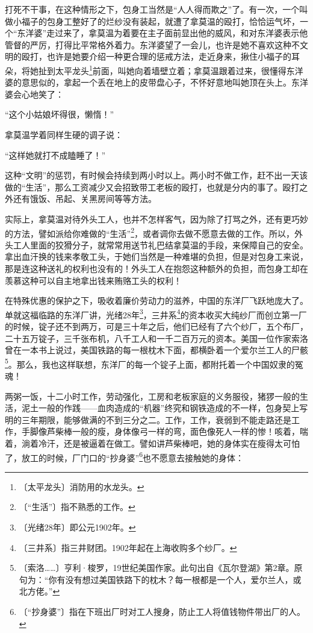 \documentclass[12pt,UTF-8,openany]{ctexbook}
\begin{document}
\begin{large}
    打死不干事，在这种情形之下，包身工当然是“人人得而欺之”了。有一次，一个叫做小福子的包身工整好了的烂纱没有装起，就遭了拿莫温的殴打，恰恰运气坏，一个“东洋婆”走过来了，拿莫温为着要在主子面前显出他的威风，和对东洋婆表示他管督的严厉，打得比平常格外着力。东洋婆望了一会儿，也许是她不喜欢这种不文明的殴打，也许是她要介绍一种更合理的惩戒方法，走近身来，揪住小福子的耳朵，将她扯到太平龙头\footnote{〔太平龙头〕消防用的水龙头。}前面，叫她向着墙壁立着；拿莫温跟着过来，很懂得东洋婆的意思似的，拿起一个丢在地上的皮带盘心子，不怀好意地叫她顶在头上。东洋婆会心地笑了：
    
    “这个小姑娘坏得很，懒惰！”
    
    拿莫温学着同样生硬的调子说：
    
    “这样她就打不成瞌睡了！”
    
    这种“文明”的惩罚，有时候会持续到两小时以上。两小时不做工作，赶不出一天该做的“生活”，那么工资减少又会招致带工老板的殴打，也就是分内的事了。殴打之外还有饿饭、吊起、关黑房间等等方法。
    
    实际上，拿莫温对待外头工人，也并不怎样客气，因为除了打骂之外，还有更巧妙的方法，譬如派给你难做的“生活”\footnote{〔“生活”〕指不熟悉的工作。}，或者调你去做不愿意去做的工作。所以，外头工人里面的狡猾分子，就常常用送节礼巴结拿莫温的手段，来保障自己的安全。拿出血汗换的钱来孝敬工头，于她们当然是一种难堪的负担，但是对包身工来说，那是连这种送礼的权利也没有的！外头工人在抱怨这种额外的负担，而包身工却在羡慕这种可以自主地拿出钱来贿赂工头的权利！
    
    在特殊优惠的保护之下，吸收着廉价劳动力的滋养，中国的东洋厂飞跃地庞大了。单就这福临路的东洋厂讲，光绪28年\footnote{〔光绪28年〕即公元1902年。}，三井系\footnote{〔三井系〕指三井财团。1902年起在上海收购多个纱厂。}的资本收买大纯纱厂而创立第一厂的时候，锭子还不到两万，可是三十年之后，他们已经有了六个纱厂，五个布厂，二十五万锭子，三千张布机，八千工人和一千二百万元的资本。美国一位作家索洛曾在一本书上说过，美国铁路的每一根枕木下面，都横卧着一个爱尔兰工人的尸骸\footnote{〔索洛……〕亨利·梭罗，19世纪美国作家。此句出自《瓦尔登湖》第2章。原句为：“你有没有想过美国铁路下的枕木？每一根都是一个人，爱尔兰人，或北方佬。”}。那么，我也这样联想，东洋厂的每一个锭子上面，都附托着一个中国奴隶的冤魂！
    
    两粥一饭，十二小时工作，劳动强化，工房和老板家庭的义务服役，猪猡一般的生活，泥土一般的作践——血肉造成的“机器”终究和钢铁造成的不一样，包身契上写明的三年期限，能够做满的不到三分之二。工作，工作，衰弱到不能走路还是工作，手脚像芦柴棒一般的瘦，身体像弓一样的弯，面色像死人一样的惨！咳着，喘着，淌着冷汗，还是被逼着在做工。譬如讲芦柴棒吧，她的身体实在瘦得太可怕了，放工的时候，厂门口的“抄身婆”\footnote{〔“抄身婆”〕指在下班出厂时对工人搜身，防止工人将值钱物件带出厂的人。}也不愿意去接触她的身体：
    

\end{large}
\end{document}
